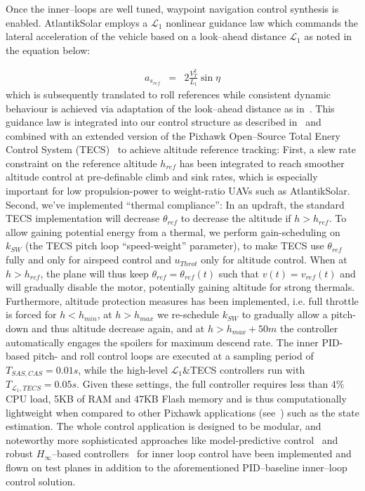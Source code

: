 Once the inner--loops are well tuned, waypoint navigation control synthesis is enabled. AtlantikSolar employs a $\mathcal{L}_1$ nonlinear guidance law which commands the lateral acceleration of the vehicle based on a look--ahead distance $\mathcal{L}_1$ as noted in the equation below:

\begin{eqnarray}
 a_{s_{ref}} &=& 2\frac{V_T^2}{L_1}\sin \eta
\end{eqnarray}
which is subsequently translated to roll references while consistent dynamic behaviour is achieved via adaptation of the look--ahead distance as in~\cite{L1stabAnalysis}. This guidance law is integrated into our control structure as described in~\cite{OMLAS_MED_14} and combined with an extended version of the Pixhawk Open--Source Total Enery Control System (TECS)~\cite{PixhawkWebsite} to achieve altitude reference tracking: First, a slew rate constraint on the reference altitude $h_{ref}$ has been integrated to reach smoother altitude control at pre-definable climb and sink rates, which is especially important for low propulsion-power to weight-ratio UAVs such as AtlantikSolar. Second, we've implemented ``thermal compliance'': In an updraft, the standard TECS implementation will decrease $\theta_{ref}$ to decrease the altitude if $h>h_{ref}$. To allow gaining potential energy from a thermal, we perform gain-scheduling on $k_{SW}$ (the TECS pitch loop ``speed-weight'' parameter), to make TECS use $\theta_{ref}$ fully and only for airspeed control and $u_{Throt}$ only for altitude control. When at $h>h_{ref}$, the plane will thus keep $\theta_{ref}=\theta_{ref}(t)$  such that $v(t)=v_{ref}(t)$ and will gradually disable the motor, potentially gaining altitude for strong thermals. Furthermore, altitude protection measures has been implemented, i.e. full throttle is forced for $h<h_{min}$, at $h>h_{max}$ we re-schedule $k_{SW}$ to gradually allow a pitch-down and thus altitude decrease again, and at $h>h_{max}+50m$ the controller automatically engages the spoilers for maximum descend rate. The inner PID-based pitch- and roll control loops are executed at a sampling period of $T_{SAS,CAS}=0.01s$, while the high-level $\mathcal{L}_1$\&TECS controllers run with $T_{\mathcal{L}_1,TECS}=0.05s$. Given these settings, the full controller requires less than 4\% CPU load, 5KB of RAM and 47KB Flash memory and is thus computationally lightweight when compared to other Pixhawk applications (see~\cite{OMLAS_MED_14}) such as the state estimation. The whole control application is designed to be modular, and noteworthy more sophisticated approaches like model-predictive control~\cite{OMLAS_MED_14} and robust $H_\infty$--based controllers~\cite{Mosimann_FT} for inner loop control have been implemented and flown on test planes in addition to the aforementioned PID--baseline inner--loop control solution. 